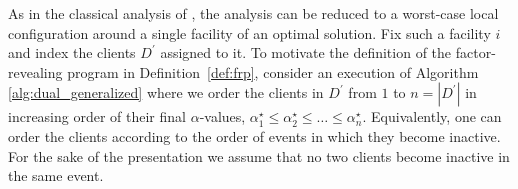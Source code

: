 As in the classical analysis of \cite{JMS02,JainMMSV03}, the analysis can be reduced to a worst-case local configuration around a single facility of an optimal solution. Fix such a facility $i$ and index the clients $D^\prime$ assigned to it. 
To motivate the definition of the factor-revealing program in Definition~\ref{def:frp}, consider an execution of Algorithm \ref{alg:dual_generalized} where we order the clients in $D^\prime$ from $1$ to $n=|D^\prime|$ in increasing order of their final $\alpha$-values, $\alpha^\star_1 \le \alpha^\star_2 \le \dots \le \alpha^\star_n$. Equivalently, one can order the clients according to the order of events in which they become inactive.
For the sake of the presentation we assume that no two clients become inactive in the same event.

